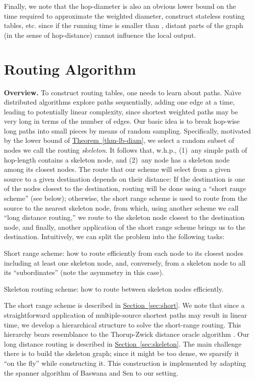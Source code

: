 \documentclass[letterpaper,11pt]{article}
\newcommand{\namedref}[2]{\hyperref[#2]{#1~\ref*{#2}}}
\newcommand{\sectionref}[1]{\namedref{Section}{#1}}
\newcommand{\theoremref}[1]{\namedref{Theorem}{#1}}
\begin{document}
Finally, we note that the hop-diameter is also an obvious lower
bound on the time required to approximate the weighted diameter,
construct stateless routing tables, etc. since if the running time is smaller
than , distant parts of the graph (in the sense of hop-distance) cannot
influence the local output.

\section{Routing Algorithm}
\label{sec:routing}

\textbf{Overview.} To construct routing tables, one needs to learn about paths.
Na\"\i ve distributed algorithms explore paths sequentially, adding one edge at
a time, leading to potentially linear complexity, since shortest weighted paths
may be very long in terms of the number of edges. Our basic idea is to break
hop-wise long paths into small pieces by means of random sampling. Specifically,
motivated by the  lower bound of
\theoremref{thm-lb-diam}, we select a random subset of
 nodes we call the routing \emph{skeleton}. It follows
that, w.h.p., (1)~any simple path of hop-length 
contains a skeleton node, and (2)~any node has a skeleton node among its closest
 nodes. The route that our scheme will select from a given
source to a given destination depends on their distance: If the destination is
one of the  nodes closest to the destination, routing will
be done using a ``short range scheme'' (see below); otherwise, the short range
scheme is used to route from the source to the nearest skeleton node, from
which, using another scheme we call ``long distance routing,'' we route to the
skeleton node closest to the destination node, and finally, another application
of the short range scheme brings us to the destination. Intuitively, we can
split the problem into the following tasks:
\begin{compactenum}
\item Short range scheme: how to route efficiently from each node to its
 closest nodes including at least one
skeleton node, and, conversely, from a
skeleton node to all its ``subordinates'' (note the asymmetry in this case).
\item Skeleton routing scheme: how to route between skeleton nodes
efficiently.
\end{compactenum}

The short range scheme is described in \sectionref{sec:short}. We note that
since a straightforward application of multiple-source shortest paths may result
in linear time,  we develop a hierarchical structure to solve the short-range
routing. This hierarchy bears resemblance to the Thorup-Zwick distance oracle
algorithm \cite{TZ-05}. Our long distance routing is described in 
\sectionref{sec:skeleton}. The main challenge there is to build the skeleton
graph; since it might be too dense, we sparsify it ``on the fly'' while
constructing it. This construction is implemented by adapting the spanner
algorithm of Baswana and Sen \cite{baswana07} to our setting.
\end{document}
